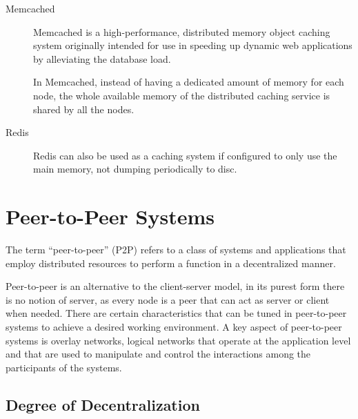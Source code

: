 	\begin{description}
	\item[Memcached]\cite{site_memcached} Memcached is a high-performance, distributed memory object caching system originally intended for use in speeding up dynamic web applications by alleviating the database load.\par
	In Memcached, instead of having a dedicated amount of memory for each node, the whole available memory of the distributed caching service is shared by all the nodes.
	
\item[Redis] Redis can also be used as a caching system if configured to only use the main memory, not dumping periodically to disc.
	\end{description}

\section{Peer-to-Peer Systems}
\label{sec:peer_to_peer_systems}
The term “peer-to-peer” (P2P) refers to a class of systems and applications that employ distributed resources to perform a function
in a decentralized manner\cite{p2p_computing}.\par
	Peer-to-peer is an alternative to the client-server model, in its purest form there is no notion of server, as every node is a peer that can act as server or client when needed. There are certain characteristics that can be tuned in peer-to-peer systems to achieve a desired working environment. A key aspect of peer-to-peer systems is overlay networks, logical networks that operate at the application level and that are used to manipulate and control the interactions among the participants of the systems.
	
\subsection{Degree of Decentralization}
\label{sec:degree_of_decentralization}

